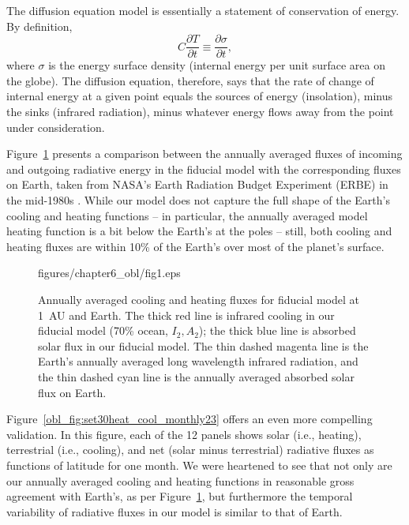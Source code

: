 The diffusion equation model is essentially a statement of
conservation of energy.  By definition,
\begin{equation}
C \frac{\partial T}{\partial t} \equiv \frac{\partial \sigma}{\partial t},
\label{eq:def hc}
\end{equation}
where $\sigma$ is the energy surface density (internal energy per unit
surface area on the globe).  The diffusion equation, therefore, says
that the rate of change of internal energy at a given point equals the
sources of energy (insolation), minus the sinks (infrared radiation),
minus whatever energy flows away from the point under consideration.

Figure~\ref{obl_fig:set30heat_cool_23p5} presents a comparison between
the annually averaged fluxes of incoming and outgoing radiative energy
in the fiducial model with the corresponding fluxes on Earth, taken
from NASA's Earth Radiation Budget Experiment (ERBE) in the mid-1980s
\citep{barkstrom_et_al1990}.  While our model does not capture the
full shape of the Earth's cooling and heating functions -- in
particular, the annually averaged model heating function is a bit
below the Earth's at the poles -- still, both cooling and heating
fluxes are within 10\% of the Earth's over most of the planet's
surface.

\begin{figure}[p]
\plotone
{figures/chapter6_obl/fig1.eps}
\caption[Annually averaged cooling and heating fluxes for fiducial
model at 1~AU and Earth.]{Annually averaged cooling and heating fluxes
for fiducial model at 1~AU and Earth. The thick red line is infrared
cooling in our fiducial model (70\% ocean, $I_2,A_2$); the thick blue
line is absorbed solar flux in our fiducial model. The thin dashed
magenta line is the Earth's annually averaged long wavelength infrared
radiation, and the thin dashed cyan line is the annually averaged
absorbed solar flux on Earth.}
\label{obl_fig:set30heat_cool_23p5}
\end{figure}

\afterpage{\clearpage}

Figure~\ref{obl_fig:set30heat_cool_monthly23} offers an even more
compelling validation.  In this figure, each of the 12 panels shows
solar (i.e., heating), terrestrial (i.e., cooling), and net (solar
minus terrestrial) radiative fluxes as functions of latitude for one
month.  We were heartened to see that not only are our annually
averaged cooling and heating functions in reasonable gross agreement
with Earth's, as per Figure~\ref{obl_fig:set30heat_cool_23p5}, but
furthermore the temporal variability of radiative fluxes in our model
is similar to that of Earth.


